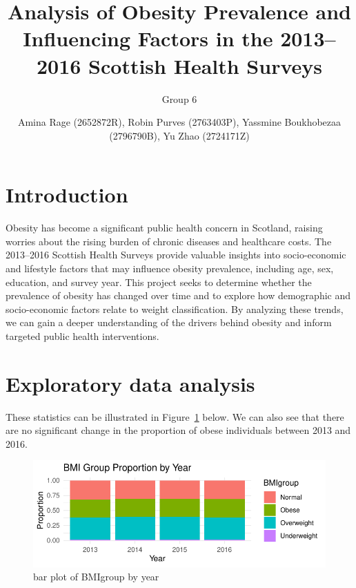 \documentclass[
  letterpaper,
  DIV=11,
  numbers=noendperiod]{scrartcl}
\title{Analysis of Obesity Prevalence and Influencing Factors in the
2013--2016 Scottish Health Surveys}
\subtitle{Group 6}
\author{Amina Rage (2652872R), Robin Purves (2763403P), Yassmine
Boukhobezaa (2796790B), Yu Zhao (2724171Z)}
\date{}
\begin{document}
\maketitle
\ifdefined\Shaded\renewenvironment{Shaded}{\begin{tcolorbox}[sharp corners, boxrule=0pt, breakable, enhanced, borderline west={3pt}{0pt}{shadecolor}, interior hidden, frame hidden]}{\end{tcolorbox}}\fi

\hypertarget{sec-intro}{%
\section{Introduction}\label{sec-intro}}

Obesity has become a significant public health concern in Scotland,
raising worries about the rising burden of chronic diseases and
healthcare costs. The 2013--2016 Scottish Health Surveys provide
valuable insights into socio-economic and lifestyle factors that may
influence obesity prevalence, including age, sex, education, and survey
year. This project seeks to determine whether the prevalence of obesity
has changed over time and to explore how demographic and socio-economic
factors relate to weight classification. By analyzing these trends, we
can gain a deeper understanding of the drivers behind obesity and inform
targeted public health interventions.

\hypertarget{sec-expdata}{%
\section{Exploratory data analysis}\label{sec-expdata}}

These statistics can be illustrated in Figure~\ref{fig-bar1} below. We
can also see that there are no significant change in the proportion of
obese individuals between 2013 and 2016.

\begin{figure}

{\centering \includegraphics{Data-analysis-12-main_files/figure-pdf/fig-bar1-1.pdf}

}

\caption{\label{fig-bar1}bar plot of BMIgroup by year}

\end{figure}
\end{document}
